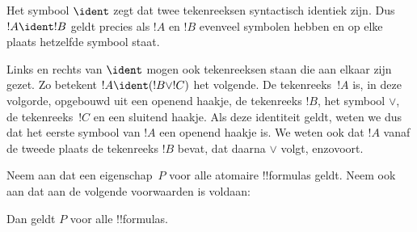 \documentclass[openany]{memoir}
\begin{document}
\begin{defn}
Het symbool $\ident$ zegt dat twee tekenreeksen syntactisch identiek
zijn. Dus $!A \ident !B$ geldt precies als $!A$ en $!B$ evenveel
symbolen hebben en op elke plaats hetzelfde symbool staat.
\end{defn}

Links en rechts van $\ident$ mogen ook tekenreeksen staan die aan
elkaar zijn gezet. Zo betekent $!A \ident (!B \lor !C)$ het volgende.
De tekenreeks~$!A$ is, in deze volgorde, opgebouwd uit een openend
haakje, de tekenreeks $!B$, het symbool $\lor$, de tekenreeks~$!C$ en
een sluitend haakje. Als deze identiteit geldt, weten we dus dat het
  eerste symbool van $!A$ een openend haakje is. We weten ook dat $!A$
  vanaf de tweede plaats de tekenreeks $!B$ bevat, dat daarna $\lor$
volgt, enzovoort.
\endgroup

\begingroup
\def\olfilename{OLP-0059}
\def\olfilepath{content/propositional-logic/syntax-and-semantics/}
\hypertarget{unit-OLP-0059}{}





\begin{thm}
  Neem aan dat een eigenschap~$P$ voor alle atomaire !!{formula}s
  geldt. Neem ook aan dat aan de volgende voorwaarden is voldaan:
  \begin{enumerate}
  \end{enumerate}
  Dan geldt $P$ voor alle !!{formula}s.
\end{thm}
\end{document}
